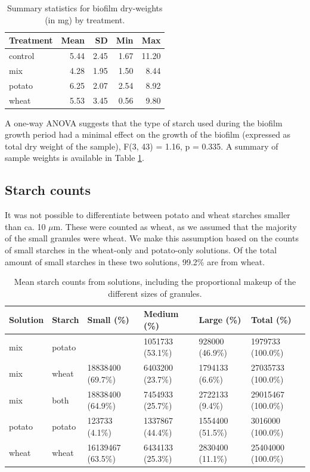 \documentclass[
]{article}
\begin{document}
\begin{table}

\caption{\label{tab:anova-tbl}Summary statistics for biofilm dry-weights (in mg) by treatment.}
\centering
\begin{tabular}[t]{l|r|r|r|r}
\hline
Treatment & Mean & SD & Min & Max\\
\hline
control & 5.44 & 2.45 & 1.67 & 11.20\\
\hline
mix & 4.28 & 1.95 & 1.50 & 8.44\\
\hline
potato & 6.25 & 2.07 & 2.54 & 8.92\\
\hline
wheat & 5.53 & 3.45 & 0.56 & 9.80\\
\hline
\end{tabular}
\end{table}

A one-way ANOVA suggests that the type of starch used during the biofilm
growth period had a minimal effect on the growth of the biofilm
(expressed as total dry weight of the sample), F(3, 43)
= 1.16, p = 0.335.
A summary of sample weights is available in Table \ref{tab:anova-tbl}.

\hypertarget{starch-counts}{%
\subsection{Starch counts}\label{starch-counts}}

It was not possible to differentiate between potato and
wheat starches smaller than ca. 10 \(\mu\)m. These were counted as wheat,
as we assumed that the majority of the small granules were wheat. We make this
assumption based on the counts of small starches in the wheat-only and potato-only
solutions. Of the total amount of small starches in these two solutions,
99.2\%
are from wheat.

\begin{table}

\caption{\label{tab:solution-count-tbl}Mean starch counts from solutions, including the
             proportional makeup of the different sizes of granules.}
\centering
\begin{tabular}[t]{l|l|l|l|l|l}
\hline
Solution & Starch & Small (\%) & Medium (\%) & Large (\%) & Total (\%)\\
\hline
mix & potato &  & 1051733 (53.1\%) & 928000 (46.9\%) & 1979733 (100.0\%)\\
\hline
mix & wheat & 18838400 (69.7\%) & 6403200 (23.7\%) & 1794133 (6.6\%) & 27035733 (100.0\%)\\
\hline
mix & both & 18838400 (64.9\%) & 7454933 (25.7\%) & 2722133 (9.4\%) & 29015467 (100.0\%)\\
\hline
potato & potato & 123733 (4.1\%) & 1337867 (44.4\%) & 1554400 (51.5\%) & 3016000 (100.0\%)\\
\hline
wheat & wheat & 16139467 (63.5\%) & 6434133 (25.3\%) & 2830400 (11.1\%) & 25404000 (100.0\%)\\
\hline
\end{tabular}
\end{table}
\end{document}
